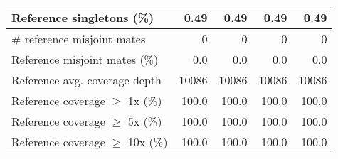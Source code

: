 \documentclass[12pt,a4paper]{article}
\begin{document}
\begin{table}[ht]
\begin{center}
\begin{tabular}{|l*{4}{|r}|}
Reference singletons (\%) & 0.49 & 0.49 & 0.49 & 0.49 \\ \hline
\# reference misjoint mates & 0 & 0 & 0 & 0 \\ \hline
Reference misjoint mates (\%) & 0.0 & 0.0 & 0.0 & 0.0 \\ \hline
Reference avg. coverage depth & 10086 & 10086 & 10086 & 10086 \\ \hline
Reference coverage $\geq$ 1x (\%) & 100.0 & 100.0 & 100.0 & 100.0 \\ \hline
Reference coverage $\geq$ 5x (\%) & 100.0 & 100.0 & 100.0 & 100.0 \\ \hline
Reference coverage $\geq$ 10x (\%) & 100.0 & 100.0 & 100.0 & 100.0 \\ \hline
\end{tabular}
\end{center}
\end{table}
\end{document}
